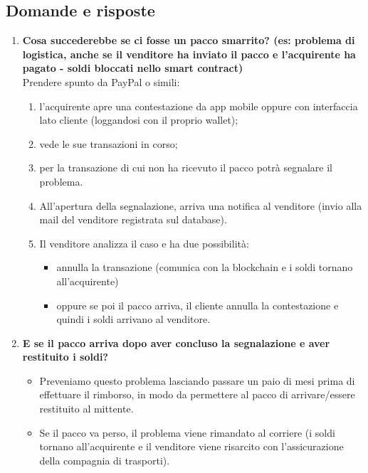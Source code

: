 \documentclass[11pt]{article}
\begin{document}
		\subsection{Domande e risposte}
			\begin{enumerate}
				\item \textbf{Cosa succederebbe se ci fosse un pacco smarrito? (es: problema di logistica, anche se il venditore ha inviato il pacco e l’acquirente ha pagato - soldi bloccati nello smart contract)}\\
				
				Prendere spunto da PayPal o simili: 
				\begin{enumerate}
					\item l’acquirente apre una contestazione da app mobile oppure con interfaccia lato cliente (loggandosi con il proprio wallet);
					\item vede le sue transazioni in corso;
					\item per la transazione di cui non ha ricevuto il pacco potrà segnalare il problema.
					\item All’apertura della segnalazione, arriva una notifica al venditore (invio alla mail del venditore registrata sul database).
					\item	Il venditore analizza il caso e ha due possibilità: 
						\begin{itemize}
							\item annulla la transazione (comunica con la blockchain e i soldi tornano all’acquirente) 
							\item oppure se poi il pacco arriva, il cliente annulla la contestazione e quindi i soldi arrivano al venditore.
						\end{itemize}
				\end{enumerate}
				\item \textbf{E se il pacco arriva dopo aver concluso la segnalazione e aver restituito i soldi?}\\
				\begin{itemize}
					\item Preveniamo questo problema lasciando passare un paio di mesi prima di effettuare il rimborso, in modo da permettere al pacco di arrivare/essere restituito al mittente.
					\item Se il pacco va perso, il problema viene rimandato al corriere (i soldi tornano all’acquirente e il venditore viene risarcito con l’assicurazione della compagnia di trasporti).
				\end{itemize}
				

\end{enumerate}
\end{document}

